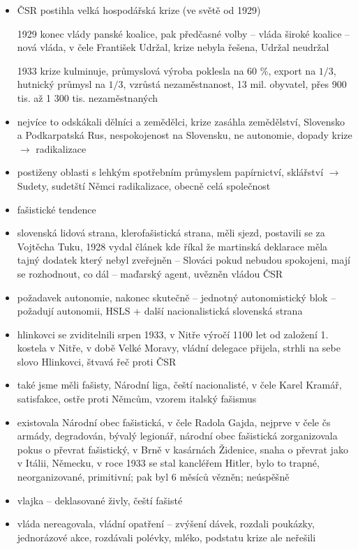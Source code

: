 \documentclass{article}
\begin{document}
\begin{itemize}
    \item ČSR postihla velká hospodářská krize (ve světě od 1929)
    \item[1929] konec vlády panské koalice, pak předčasné volby -- vláda široké koalice -- nová vláda, v čele František Udržal, krize nebyla řešena, Udržal neudržal
    \item[1933] krize kulminuje, průmyslová výroba poklesla na 60 \%, export na $1/3$, hutnický průmysl na $1/3$, vzrůstá nezaměstnanost, 13 mil. obyvatel, přes 900 tis. až 1 300 tis. nezaměstnaných
    \item nejvíce to odskákali dělníci a zemědělci, krize zasáhla zemědělství, Slovensko a Podkarpatská Rus, nespokojenost na Slovensku, ne autonomie, dopady krize $\rightarrow$ radikalizace
    \item postiženy oblasti s lehkým spotřebním průmyslem papírnictví, sklářství $\rightarrow$ Sudety, sudetští Němci radikalizace, obecně celá společnost
    \item fašistické tendence
    \item slovenská lidová strana, klerofašistická strana, měli sjezd, postavili se za Vojtěcha Tuku, 1928 vydal článek kde říkal že martinská deklarace měla tajný dodatek který nebyl zveřejněn -- Slováci pokud nebudou spokojeni, mají se rozhodnout, co dál -- maďarský agent, uvězněn vládou ČSR
    \item požadavek autonomie, nakonec skutečně -- jednotný autonomistický blok -- požadují autonomii, HSLS + další nacionalistická slovenská strana
    \item hlinkovci se zviditelnili srpen 1933, v Nitře výročí 1100 let od založení 1. kostela v Nitře, v době Velké Moravy, vládní delegace přijela, strhli na sebe slovo Hlinkovci, štvavá řeč proti ČSR
    \item také jsme měli fašisty, Národní liga, čeští nacionalisté, v čele Karel Kramář, satisfakce, ostře proti Němcům, vzorem italský fašismus
    \item existovala Národní obec fašistická, v čele Radola Gajda, nejprve v čele čs armády, degradován, bývalý legionář, národní obec fašistická zorganizovala pokus o převrat fašistický, v Brně v kasárnách Židenice, snaha o převrat jako v Itálii, Německu, v roce 1933 se stal kancléřem Hitler, bylo to trapné, neorganizované, primitivní; pak byl 6 měsíců vězněn; neúspěšně
    \item vlajka -- deklasované živly, čeští fašisté
    \item vláda nereagovala, vládní opatření -- zvýšení dávek, rozdali poukázky, jednorázové akce, rozdávali polévky, mléko, podstatu krize ale neřešili

\end{itemize}
\end{document}
